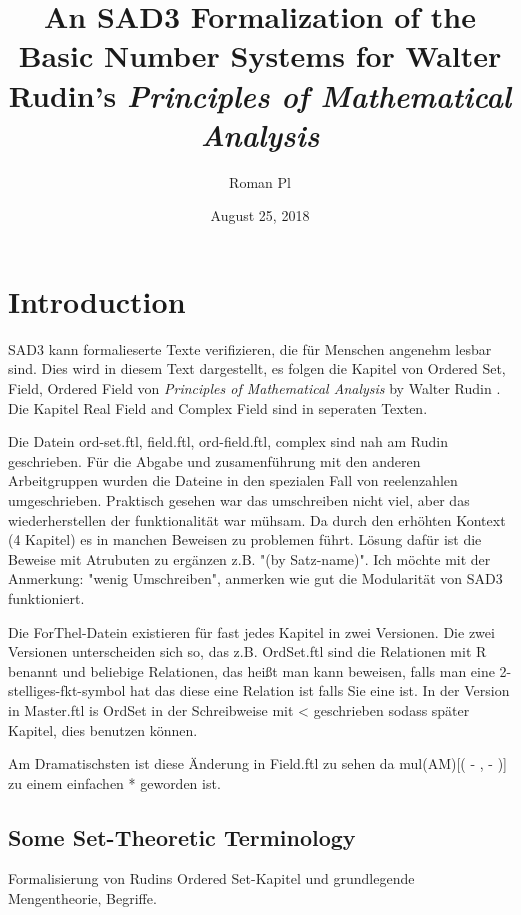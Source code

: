 \documentclass{article}
\begin{document}
\title{An SAD3 Formalization of the Basic Number Systems for Walter Rudin's
\it{Principles of Mathematical Analysis}}

\author{Roman Pl}

\date{August 25, 2018}

\maketitle


\section{Introduction}
SAD3 kann formalieserte Texte verifizieren, die für Menschen angenehm lesbar sind.
Dies wird in diesem Text dargestellt, es folgen die Kapitel von Ordered Set, Field, Ordered Field von {\it Principles of Mathematical Analysis} by Walter Rudin \cite{Rudin}.
Die Kapitel Real Field and Complex Field sind in seperaten Texten.

Die Datein ord-set.ftl, field.ftl, ord-field.ftl, complex sind nah am Rudin geschrieben. Für die Abgabe und zusamenführung mit den anderen Arbeitgruppen wurden die Dateine in den spezialen Fall von reelenzahlen umgeschrieben. Praktisch gesehen war das umschreiben nicht viel, aber das wiederherstellen der funktionalität war mühsam. Da durch den erhöhten Kontext (4 Kapitel) es in manchen Beweisen zu problemen führt.
Lösung dafür ist die Beweise mit Atrubuten zu ergänzen z.B. "(by Satz-name)".
Ich möchte mit der Anmerkung: "wenig Umschreiben", anmerken wie gut die Modularität von SAD3 funktioniert.

Die ForThel-Datein existieren für fast jedes Kapitel in zwei Versionen.
Die zwei Versionen unterscheiden sich so, das z.B. OrdSet.ftl sind die Relationen mit R benannt und beliebige Relationen, das heißt man kann beweisen, falls man eine 2-stelliges-fkt-symbol hat das diese eine Relation ist falls Sie eine ist.
In der Version in Master.ftl is OrdSet in der Schreibweise mit < geschrieben sodass später Kapitel, dies benutzen können.

Am Dramatischsten ist diese Änderung in Field.ftl zu sehen da mul(AM)[( - , - )] zu einem einfachen * geworden ist.


\subsection{Some Set-Theoretic Terminology}

Formalisierung von Rudins Ordered Set-Kapitel und grundlegende Mengentheorie, Begriffe.
\end{document}
